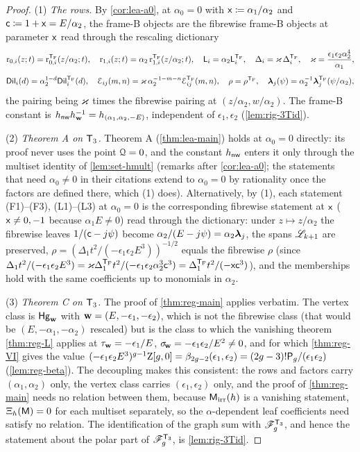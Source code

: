 \begin{proof}
(1) \emph{The rows.} By \cref{cor:lea-a0}, at $\alpha_0=0$ with $\mathsf{x}\coloneqq\alpha_1/\alpha_2$ and $\mathsf{c}\coloneqq 1+\mathsf{x}=E/\alpha_2$, the frame-B objects are the fibrewise frame-B objects at parameter $\mathsf{x}$ read through the rescaling dictionary
\[
\mathrm{r}_{0,i}(z;t)=\mathrm{r}^{\mathsf{T}_{\mathrm{F}}}_{0,i}(z/\alpha_2;t),\quad \mathrm{r}_{1,i}(z;t)=\alpha_2\,\mathrm{r}^{\mathsf{T}_{\mathrm{F}}}_{1,i}(z/\alpha_2;t),\quad \mathsf{L}_i=\alpha_2\mathsf{L}^{\mathsf{T}_{\mathrm{F}}}_i,\quad \Delta_i=\varkappa\,\Delta^{\mathsf{T}_{\mathrm{F}}}_i,\quad \varkappa=\frac{\epsilon_1\epsilon_2\alpha_2^4}{\alpha_1},
\]
\[
\mathsf{Dil}_i(d)=\alpha_2^{1-d}\mathsf{Dil}^{\mathsf{T}_{\mathrm{F}}}_i(d),\quad \mathcal{E}_{ij}(m,n)=\varkappa\,\alpha_2^{-1-m-n}\mathcal{E}^{\mathsf{T}_{\mathrm{F}}}_{ij}(m,n),\quad \rho=\rho^{\mathsf{T}_{\mathrm{F}}},\quad \boldsymbol{\lambda}_j(\psi)=\alpha_2^{-1}\boldsymbol{\lambda}^{\mathsf{T}_{\mathrm{F}}}_j(\psi/\alpha_2),
\]
the pairing being $\varkappa$ times the fibrewise pairing at $(z/\alpha_2,w/\alpha_2)$. The frame-B constant is $h_{\mathsf{nw}}h_{\mathbf{w}}^{-1}=h_{(\alpha_1,\alpha_2,-E)}$, independent of $\epsilon_1,\epsilon_2$ (\cref{lem:rig-3Tid}).

(2) \emph{Theorem A on $\mathsf{T}_{3}$.} Theorem A (\cref{thm:lea-main}) holds at $\alpha_0=0$ directly: its proof never uses the point $\mathcal{Q}=0$, and the constant $h_{\mathsf{nw}}$ enters it only through the multiset identity of \cref{lem:set-hmult} (remarks after \cref{cor:lea-a0}; the statements that need $\alpha_0\neq 0$ in their citations extend to $\alpha_0=0$ by rationality once the factors are defined there, which (1) does). Alternatively, by (1), each statement (F1)--(F3), (L1)--(L3) at $\alpha_0=0$ is the corresponding fibrewise statement at $\mathsf{x}$ ($\mathsf{x}\neq 0,-1$ because $\alpha_1E\neq 0$) read through the dictionary: under $z\mapsto z/\alpha_2$ the fibrewise leaves $1/(\mathsf{c}-j\psi)$ become $\alpha_2/(E-j\psi)=\alpha_2\boldsymbol{\lambda}_j$, the spans $\mathscr{L}_{k+1}$ are preserved, $\rho=(\Delta_1t^2/(-\epsilon_1\epsilon_2E^3))^{-1/2}$ equals the fibrewise $\rho$ (since $\Delta_1t^2/(-\epsilon_1\epsilon_2E^3)=\varkappa\Delta^{\mathsf{T}_{\mathrm{F}}}_1t^2/(-\epsilon_1\epsilon_2\alpha_2^3\mathsf{c}^3)=\Delta^{\mathsf{T}_{\mathrm{F}}}_1t^2/(-\mathsf{x}\mathsf{c}^3)$), and the memberships hold with the same coefficients up to monomials in $\alpha_2$.

(3) \emph{Theorem C on $\mathsf{T}_{3}$.} The proof of \cref{thm:reg-main} applies verbatim. The vertex class is $\mathsf{Hg}_{\mathbf{w}}$ with $\mathbf{w}=(E,-\epsilon_1,-\epsilon_2)$, which is not the fibrewise class (that would be $(E,-\alpha_1,-\alpha_2)$ rescaled) but is the class to which the vanishing theorem \cref{thm:reg-L} applies at $\tau_{\mathbf{w}}=-\epsilon_1/E$, $\sigma_{\!\mathbf{w}}=-\epsilon_1\epsilon_2/E^2\neq 0$, and for which \cref{thm:reg-VI} gives the value $(-\epsilon_1\epsilon_2E^3)^{g-1}\mathrm{Z}[g,0]=\beta_{2g-2}(\epsilon_1,\epsilon_2)=(2g-3)!\mathsf{P}_{g}/(\epsilon_1\epsilon_2)$ (\cref{lem:reg-beta}). The decoupling makes this consistent: the rows and factors carry $(\alpha_1,\alpha_2)$ only, the vertex class carries $(\epsilon_1,\epsilon_2)$ only, and the proof of \cref{thm:reg-main} needs no relation between them, because $\mathsf{M}_{\mathrm{irr}}(h)$ is a vanishing statement, $\Xi_h(\mathsf{M})=0$ for each multiset separately, so the $\alpha$-dependent leaf coefficients need satisfy no relation. The identification of the graph sum with $\mathscr{F}^{\mathsf{T}_{3}}_g$, and hence the statement about the polar part of $\mathscr{F}^{\mathsf{T}_{3}}_g$, is \cref{lem:rig-3Tid}.
\end{proof}

